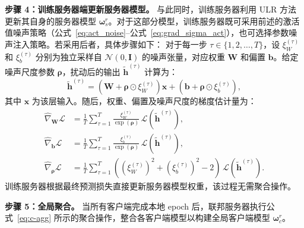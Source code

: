 \textbf{步骤 4：训练服务器端更新服务器模型。}
与此同时，训练服务器利用 ULR 方法更新其自身的服务器模型 $\boldsymbol{\omega}_s^r$。对于这部分模型，训练服务器既可采用前述的激活值噪声策略（公式~\ref{eq:act_noise}--公式~\ref{eq:grad_sigma_act}），也可选择参数噪声注入策略。若采用后者，具体步骤如下：
对于每一步 $\tau \in \{1, 2, \dots, T\}$，设 $\xi_W^{(\tau)}$ 和 $\xi_b^{(\tau)}$ 分别为独立采样自 $\mathcal{N}(0, \mathbf{I})$ 的噪声张量，对应权重 $\mathbf{W}$ 和偏置 $\mathbf{b}$。给定噪声尺度参数 $\boldsymbol{\rho}$，扰动后的输出 $\tilde{\mathbf{h}}^{(\tau)}$ 计算为：
\begin{equation}
\label{eq:param_noise}
\tilde{\mathbf{h}}^{(\tau)} = (\mathbf{W} + \boldsymbol{\rho} \odot \xi_W^{(\tau)}) \mathbf{x} + (\mathbf{b} + \boldsymbol{\rho} \odot \xi_b^{(\tau)}),
\end{equation}
其中 $\mathbf{x}$ 为该层输入。随后，权重、偏置及噪声尺度的梯度估计量为：
\begin{align}
\label{eq:grad_w}
\hat{\nabla}_{\mathbf{W}} \mathcal{L} &= \frac{1}{T} \sum_{\tau=1}^{T} \frac{\xi_W^{(\tau)}}{\exp(\boldsymbol{\rho})} \, \mathcal{L}(\tilde{\mathbf{h}}^{(\tau)}), \\
\label{eq:grad_b}
\hat{\nabla}_{\mathbf{b}} \mathcal{L} &= \frac{1}{T} \sum_{\tau=1}^{T} \frac{\xi_b^{(\tau)}}{\exp(\boldsymbol{\rho})} \, \mathcal{L}(\tilde{\mathbf{h}}^{(\tau)}), \\
\label{eq:grad_sigma_param}
\hat{\nabla}_{\boldsymbol{\rho}} \mathcal{L} &= \frac{1}{T} \sum_{\tau=1}^{T} \left((\xi_W^{(\tau)})^2 + (\xi_b^{(\tau)})^2 - 2 \right) \, \mathcal{L}(\tilde{\mathbf{h}}^{(\tau)}).
\end{align}
训练服务器根据最终预测损失直接更新服务器模型权重，该过程无需聚合操作。

\textbf{步骤 5：全局聚合。}
当所有客户端完成本地 epoch 后，联邦服务器执行公式~\ref{eq:c-agg} 所示的聚合操作，整合各客户端模型以构建全局客户端模型 $\boldsymbol{\omega}_c^r$。

